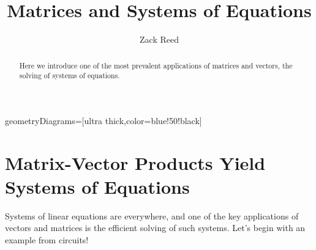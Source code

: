 \documentclass{ximera}
\author{Zack Reed} %
\title{Matrices and Systems of Equations}
\begin{document}
\begin{abstract}
Here we introduce one of the most prevalent applications of matrices and vectors, the solving of systems of equations.
\end{abstract}
\maketitle



\tikzstyle geometryDiagrams=[ultra thick,color=blue!50!black]

\section{Matrix-Vector Products Yield Systems of Equations}

Systems of linear equations are everywhere, and one of the key applications of vectors and matrices is the efficient solving of such systems. Let's begin with an example from circuits!
\end{document}

